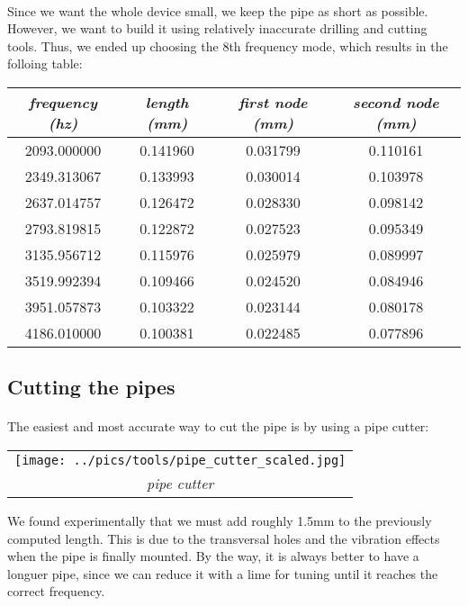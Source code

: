\documentclass[12pt]{article}
\begin{document}
\paragraph{} Since we want the whole device small, we keep the pipe as short
as possible. However, we want to build it using relatively inaccurate
drilling and cutting tools. Thus, we ended up choosing the 8th frequency mode,
which results in the folloing table:
\begin{center}
  \begin{tabular}{|c|c|c|c|}
    \hline
    \textit{frequency (hz)} &
    \textit{length (mm)} &
    \textit{first node (mm)} &
    \textit{second node (mm)} \\
    \hline
    2093.000000 & 0.141960 & 0.031799 & 0.110161 \\
    \hline
    2349.313067 & 0.133993 & 0.030014 & 0.103978 \\
    \hline
    2637.014757 & 0.126472 & 0.028330 & 0.098142 \\
    \hline
    2793.819815 & 0.122872 & 0.027523 & 0.095349 \\
    \hline
    3135.956712 & 0.115976 & 0.025979 & 0.089997 \\
    \hline
    3519.992394 & 0.109466 & 0.024520 & 0.084946 \\
    \hline
    3951.057873 & 0.103322 & 0.023144 & 0.080178 \\
    \hline
    4186.010000 & 0.100381 & 0.022485 & 0.077896 \\
    \hline
\end{tabular}
\end{center}

\subsection{Cutting the pipes}
\paragraph{} The easiest and most accurate way to cut the pipe is by using a pipe cutter:
\begin{center}
  \begin{tabular}{c}
    \texttt{[image: ../pics/tools/pipe\_cutter\_scaled.jpg]}
    \\
    \smallskip
    \tiny{\textit{pipe cutter}}
  \end{tabular}
\end{center}
We found experimentally that we must add roughly 1.5mm to the previously computed length.
This is due to the transversal holes and the vibration effects when the pipe is finally
mounted. By the way, it is always better to have a longuer pipe, since we can reduce it
with a lime for tuning until it reaches the correct frequency.
\end{document}
